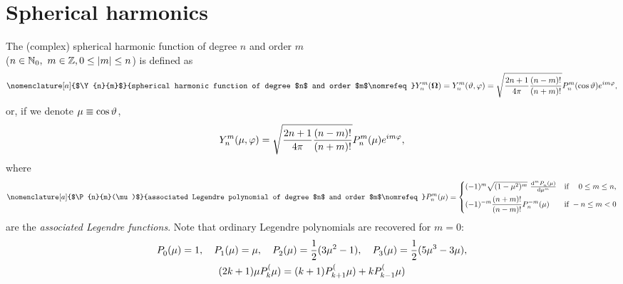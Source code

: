 \chapter{Spherical harmonics}\label{app:SH}
The (complex)
spherical harmonic function of degree $n$ and order $m$\\ ($n\in\mathbb{N}_0,\ m\in\mathbb{Z}, 0\leq \abs{m} \leq n$) 
is defined as
\begin{equation}\label{eq:Ynm}
\nomenclature[a]{$\Y{n}{m}$}{spherical harmonic function of degree $n$ and order $m$\nomrefeq}
    \Y{n}{m}(\bomega) = \Y{n}{m}(\polar,\azimuthal) = 
    \sqrt{\frac{2n+1}{4\pi}\frac{(n-m)!}{(n+m)!}} \P{n}{m}(\cos\polar)e^{i m \azimuthal},
\end{equation}
or, if we denote $\mu \equiv \cos\polar$,
$$
	\Y{n}{m}(\mu,\azimuthal) = \sqrt{\frac{2n+1}{4\pi}\frac{(n-m)!}{(n+m)!}} \P{n}{m}(\mu)e^{i m \azimuthal},
$$
where
\begin{equation}\label{eq:associated_Pn}
    \nomenclature[a]{$\P{n}{m}(\mu)$}{associated Legendre polynomial of degree $n$ and order $m$\nomrefeq} 
    \P{n}{m}(\mu) = 
    \begin{cases} 
    	(-1)^m\sqrt{(1-\mu^2)^m}\ \der[m]{\P{n}{}(\mu)}{\mu} & \mbox{if } \hphantom{-}\,0 \leq m \leq n,\\[.5em]
    \displaystyle (-1)^{-m}\frac{(n+m)!}{(n-m)!}\P{n}{-m}(\mu) & \mbox{if } -n \leq m < 0 
    \end{cases}
\end{equation}
are the \textit{associated Legendre functions}. Note that ordinary Legendre polynomials are recovered for $m = 0$:
\begin{equation*}
\begin{gathered}
	\P{0}{}(\mu) = 1,\quad \P{1}{}(\mu) = \mu,\quad \P{2}{}(\mu) = \frac12(3\mu^2 - 1),
\quad \P{3}{}(\mu) = \frac12(5\mu^3 - 3\mu),\\
 	(2k + 1)\mu\P{k}(\mu) = (k+1)\P{k+1}(\mu) + k\P{k-1}(\mu)
\end{gathered}
\end{equation*}


